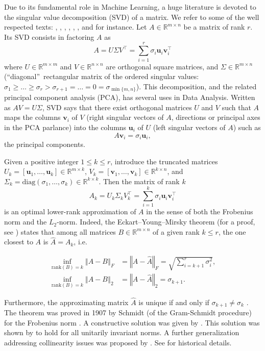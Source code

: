 \documentclass{article}
\def\u{\mathbf u}
\def\v{\mathbf v}
\begin{document}
Due to its fundamental role in Machine Learning, a huge literature is devoted
to the singular value decomposition (SVD) of a matrix. We refer to some of the
well respected texts: \cite{strang1993introduction}, \cite{trefethen1997numerical}, \cite{watkins2004fundamentals}, \cite{gentle2007matrix}, \cite{elden2007matrix}, \cite{lange2010numerical},
and \cite{yanai2011projection} for
instance. Let $A\in \mathbb{R}^{m\times n}$ be a matrix of rank $r$. Its SVD consists in factoring $A$ as
\[
A=U\Sigma V^\top=\sum_{i=1}^{r}\sigma_{i}\u_{i}\v_{i}^\top
\]
where $U\in\mathbb{R}^{m\times m}$ and $V\in\mathbb{R}^{n\times n}$ are orthogonal square matrices, and $\Sigma\in\mathbb{R}^{m\times n}$ (\textquotedblleft diagonal\textquotedblright\ rectangular matrix of the ordered singular values: $\sigma_{1}\geq\ldots\geq\sigma _{r}>\sigma_{r+1}=\ldots=0=\sigma_{\min\{m,n\}}$). This
decomposition, and the related principal component analysis (PCA), has several
uses in Data Analysis. Written as $AV=U\Sigma$, SVD says that there exist orthogonal matrices $U$ and $V$ such that $A$ maps the columns $\v_{i}$ of $V$ (right singular vectors of $A$, directions or principal axes in the PCA parlance) into the columns $\u_{i}$ of $U$ (left singular vectors of $A$) such as
\[
A\v_{i}=\sigma_{i}\u_{i},
\]
the principal components.

Given a positive integer $1\leq k\leq r$, introduce the truncated matrices
$U_{k}=\left[  \u_{1},\ldots,\u_{k}\right]  \in \mathbb{R}^{m\times k}$, $V_{k}=\left[  \v_{1},\ldots,\v_{k}\right]  \in \mathbb{R}^{k\times n}$, and $\Sigma_{k}=\mathrm{diag}(  \sigma_{1},\ldots,\sigma_{k}) \in \mathbb{R}^{k\times k}$. Then the matrix of rank $k$
\[
A_{k}=U_{k}\Sigma_{k}V_{k}^\top=\sum_{i=1}^{k}\sigma_{i}\u_{i}\v_{i}^\top
\]
is an optimal lower-rank approximation of $A$ in the sense of both the
Frobenius norm and the $L_2$-norm. Indeed, the Eckart--Young--Mirsky theorem (for
a proof, see \cite{markovsky2012low}) states that among all matrices $B\in\mathbb{R}^{m\times n}$ of a given rank $k\leq r$, the one closest to $A$ is
$\hat{A}=A_{k}$, i.e.

\begin{align*}
\inf_{\mathrm{rank}(B)=k}\left\Vert A-B\right\Vert _{F} &  =\left\Vert
A-\hat{A}\right\Vert _{F}=\sqrt{\sum_{i=k+1}^{r}\sigma_{i}^{2}},\\
\inf_{\mathrm{rank}(B)=k}\left\Vert A-B\right\Vert _{2} &  =\left\Vert
A-\hat{A}\right\Vert _{2}=\sigma_{k+1}.
\end{align*}

Furthermore, the approximating matrix $\hat{A}$ is unique if and only if
$\sigma_{k+1}\neq\sigma_{k}$ \citep{markovsky2012low}. The theorem was proved in 1907 by Schmidt (of the Gram-Schmidt procedure) for the Frobenius norm \citep{leon2013gram}. A constructive solution was given by \cite{eckart1936approximation}. This solution was
shown by \cite{mirsky1960symmetric} to hold for all unitarily invariant norms. A further generalization addressing collinearity issues was proposed by \cite{golub1987generalization}. See \cite{stewart1993early} for historical details. 
\end{document}
